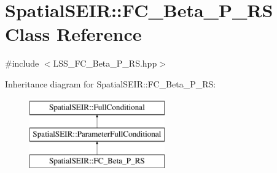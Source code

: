 \hypertarget{classSpatialSEIR_1_1FC__Beta__P__RS}{\section{Spatial\-S\-E\-I\-R\-:\-:F\-C\-\_\-\-Beta\-\_\-\-P\-\_\-\-R\-S Class Reference}
\label{classSpatialSEIR_1_1FC__Beta__P__RS}
}


{\ttfamily \#include $<$L\-S\-S\-\_\-\-F\-C\-\_\-\-Beta\-\_\-\-P\-\_\-\-R\-S.\-hpp$>$}

Inheritance diagram for Spatial\-S\-E\-I\-R\-:\-:F\-C\-\_\-\-Beta\-\_\-\-P\-\_\-\-R\-S\-:\begin{figure}[H]
\begin{center}
\leavevmode
\includegraphics[height=3.000000cm]{classSpatialSEIR_1_1FC__Beta__P__RS}
\end{center}
\end{figure}
